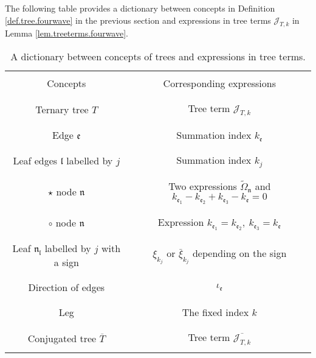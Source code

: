 The following table provides a dictionary between concepts in Definition \ref{def.tree.fourwave} in the previous section and expressions in tree terms $\mathcal{J}_{T,k}$ in Lemma \ref{lem.treeterms.fourwave}.

\begin{table}[H]
\begin{center}
 \begin{longtable}{|c|c|}
 \hline
 & \\
 Concepts & Corresponding expressions \\
 & \\
 \hline
 & \\
 Ternary tree $T$ & Tree term $\mathcal{J}_{T,k}$\\
 & \\
 \hline
 & \\
 Edge $\mathfrak{e}$ & Summation index $k_{\mathfrak{e}}$\\
 & \\
 \hline
 & \\
 Leaf edges $\mathfrak{l}$ labelled by $j$ & Summation index $k_{j}$\\
 & \\
 \hline
 & \\
 $\star$ node $\mathfrak{n}$ & Two expressions $\widetilde{\Omega}_{\mathfrak{n}}$ and $k_{\mathfrak{e}_1}-k_{\mathfrak{e}_2}+k_{\mathfrak{e}_3}-k_{\mathfrak{e}}=0$\\
 & \\
 \hline
 & \\
 $\circ$ node $\mathfrak{n}$ & Expression $k_{\mathfrak{e}_1}=k_{\mathfrak{e}_2},\ k_{\mathfrak{e}_3}=k_{\mathfrak{e}}$\\
 & \\
 \hline
 & \\
 Leaf $\mathfrak{n}_{\mathfrak{l}}$ labelled by $j$ with a sign & $\xi_{k_j}$ or $\bar{\xi}_{k_j}$ depending on the sign\\
 & \\
 \hline
 & \\
 Direction of edges & $\iota_{\mathfrak{e}}$\\
 & \\
 \hline
 & \\
 Leg & The fixed index $k$\\
 & \\
 \hline
 & \\
 Conjugated tree $\overline{T}$ & Tree term $\overline{\mathcal{J}_{T,k}}$ \\
 & \\
 \hline
 \end{longtable}
\end{center}
\caption{\label{tab.dict.fourwave} A dictionary between concepts of trees and expressions in tree terms.}
\end{table}

